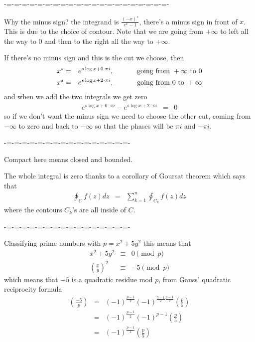 \documentclass[aps,preprint,preprintnumbers,nofootinbib,showpacs,prd]{revtex4-1}
\newcommand{\nbea}{\begin{eqnarray*}}
\newcommand{\neea}{\end{eqnarray*}}
\begin{document}
-=-=-=-=-=-=-=-=-=-=-=-=-=-=-=-=-=-=-=-=-=-

Why the minus sign? the integrand is $\frac{(-x)^s}{e^x - 1}$, there's a minus sign in front of $x$. This is due to the choice of contour. Note that we are going from $+\infty$ to left all the way to 0 and then to the right all the way to $+\infty$.

If there's no minus sign and this is the cut we choose, then
%
\nbea
x^s & = & e^{s\log x + 0\cdot\pi i} , ~~~~~~~~~~ {\rm going~from~} +\infty {\rm ~to~} 0 \\
x^s & = & e^{s\log x + 2\cdot\pi i} , ~~~~~~~~~~ {\rm going~from~} 0 {\rm ~to~} +\infty
\neea
% 
and when we add the two integrals we get zero
%
\nbea
e^{s\log x + 0\cdot\pi i} - e^{s\log x + 2\cdot\pi i} & = & 0
\neea
%
so if we don't want the minus sign we need to choose the other cut, coming from $-\infty$ to zero and back to $-\infty$ so that the phases will be $\pi i$ and $-\pi i$.

-=-=-=-=-=-=-=-=-=-=-=-=-=-=-=-=-

Compact here means closed and bounded.

The whole integral is zero thanks to a corollary of Goursat theorem which says that
%
\nbea
\oint_C f(z) dz & = & \sum_{k=1}^n \oint_{C_k} f(z) dz
\neea
%
where the contours $C_k$'s are all inside of $C$.

-=-=-=-=-=-=-=-=-=-=-=-=-=-=-=-=-

Classifying prime numbers with $p = x^2 + 5y^2$ this means that
%
\nbea
x^2 + 5y^2 & \equiv & 0 \pmod{p} \\
\left(\frac{x}{y}\right)^2 & \equiv & -5 \pmod{p}
\neea
%
which means that $-5$ is a quadratic residue mod $p$, from Gauss' quadratic reciprocity formula
%
\nbea
\left(\frac{-5}{p}\right) & = & (-1)^{\frac{p-1}{2}} (-1)^{\frac{5-1}{2}\frac{p-1}{2}} \left(\frac{p}{5}\right) \\
& = & (-1)^{\frac{p-1}{2}} (-1)^{p-1} \left(\frac{p}{5}\right) \\
& = & (-1)^{\frac{p-1}{2}} \left(\frac{p}{5}\right)
\neea
%
\end{document}
